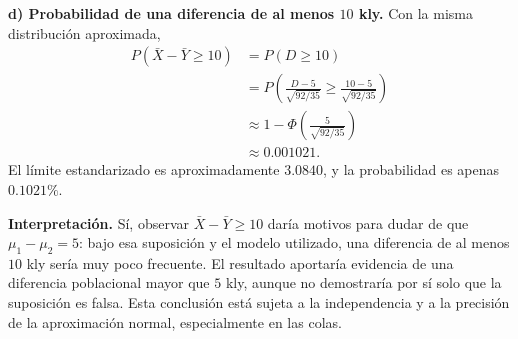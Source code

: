 \documentclass[a4paper]{article}
\begin{document}
\textbf{d) Probabilidad de una diferencia de al menos $10$ kly.}
Con la misma distribución aproximada,
\begin{align*}
P(\bar{X}-\bar{Y}\ge 10)
&=P(D\ge 10)\\
&=P\left(\frac{D-5}{\sqrt{92/35}}\ge\frac{10-5}{\sqrt{92/35}}\right)\\
&\approx 1-\Phi\left(\frac{5}{\sqrt{92/35}}\right)\\
&\approx\boxed{0.001021}.
\end{align*}
El límite estandarizado es aproximadamente $3.0840$, y la probabilidad es apenas $0.1021\%$.

\textbf{Interpretación.} Sí, observar $\bar{X}-\bar{Y}\ge 10$ daría motivos para dudar de que $\mu_1-\mu_2=5$: bajo esa suposición y el modelo utilizado, una diferencia de al menos $10$ kly sería muy poco frecuente. El resultado aportaría evidencia de una diferencia poblacional mayor que $5$ kly, aunque no demostraría por sí solo que la suposición es falsa. Esta conclusión está sujeta a la independencia y a la precisión de la aproximación normal, especialmente en las colas.
\end{document}
